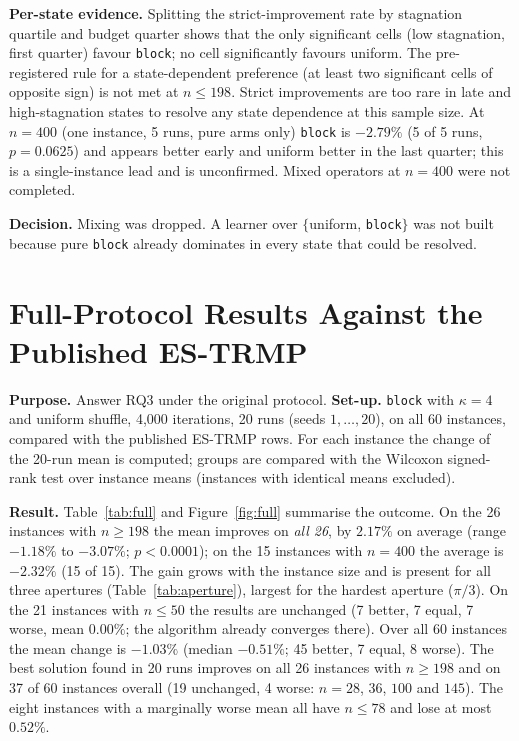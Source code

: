 \textbf{Per-state evidence.} Splitting the strict-improvement rate by stagnation quartile and budget quarter shows that the only significant cells (low stagnation, first quarter) favour \texttt{block}; no cell significantly favours uniform. The pre-registered rule for a state-dependent preference (at least two significant cells of opposite sign) is not met at $n\le198$. Strict improvements are too rare in late and high-stagnation states to resolve any state dependence at this sample size. At $n=400$ (one instance, 5 runs, pure arms only) \texttt{block} is $-2.79\%$ (5 of 5 runs, $p=0.0625$) and appears better early and uniform better in the last quarter; this is a single-instance lead and is unconfirmed. Mixed operators at $n=400$ were not completed.

\textbf{Decision.} Mixing was dropped. A learner over $\{$uniform, \texttt{block}$\}$ was not built because pure \texttt{block} already dominates in every state that could be resolved.


\section{Full-Protocol Results Against the Published ES-TRMP}\label{sec:exp-full}

\textbf{Purpose.} Answer RQ3 under the original protocol. \textbf{Set-up.} \texttt{block} with $\kappa=4$ and uniform shuffle, 4{,}000 iterations, 20 runs (seeds $1,\ldots,20$), on all 60 instances, compared with the published ES-TRMP rows. For each instance the change of the 20-run mean is computed; groups are compared with the Wilcoxon signed-rank test over instance means (instances with identical means excluded).

\textbf{Result.} Table~\ref{tab:full} and Figure~\ref{fig:full} summarise the outcome. On the 26 instances with $n\ge198$ the mean improves on \emph{all 26}, by $2.17\%$ on average (range $-1.18\%$ to $-3.07\%$; $p<0.0001$); on the 15 instances with $n=400$ the average is $-2.32\%$ (15 of 15). The gain grows with the instance size and is present for all three apertures (Table~\ref{tab:aperture}), largest for the hardest aperture ($\pi/3$). On the 21 instances with $n\le50$ the results are unchanged (7 better, 7 equal, 7 worse, mean $0.00\%$; the algorithm already converges there). Over all 60 instances the mean change is $-1.03\%$ (median $-0.51\%$; 45 better, 7 equal, 8 worse). The best solution found in 20 runs improves on all 26 instances with $n\ge198$ and on 37 of 60 instances overall (19 unchanged, 4 worse: $n=28$, $36$, $100$ and $145$). The eight instances with a marginally worse mean all have $n\le78$ and lose at most $0.52\%$.

